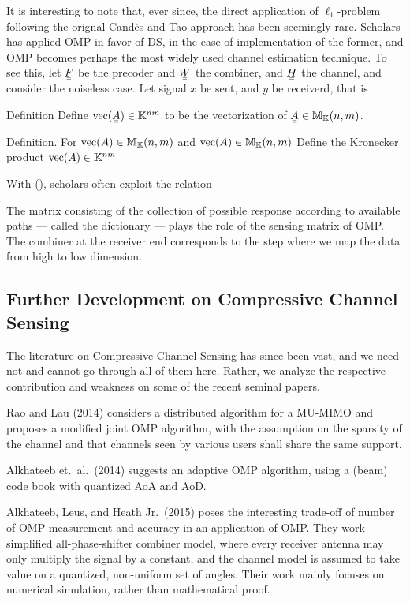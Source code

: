 It is interesting to note that, ever since, the direct application of \(\ell_1\)-problem following the orignal Cand\`es-and-Tao approach has been seemingly rare.
Scholars has applied OMP in favor of DS, in the ease of implementation of the former, and OMP becomes perhaps the most widely used channel estimation technique.
To see this, let \(\M{F}\) be the precoder and \(\M{W}\) the combiner, and \(\M{H}\) the channel, and consider the noiseless case.
Let signal \(x\) be sent, and \(y\) be receiverd, that is
%
%

\Result
{Definition}
{
Define \(\RM{vec}(\M{A}) \in \MB{K}^{nm}\) to be the vectorization of \(\M{A} \in \MB{M}_{\MB{K}}(n,m)\).
}

\Result
{Definition.}
{
For \(\mathrm{vec}(A) \in \mathbb{M}_{\mathbb{K}}(n,m)\) and \(\mathrm{vec}(A) \in \mathbb{M}_{\mathbb{K}}(n,m)\)
Define the Kronecker product \(\mathrm{vec}(A) \in \mathbb{K}^{nm}\) 
}

With (), scholars often exploit the relation
%
%

The matrix consisting of the collection of possible response according to available paths --- called the dictionary --- plays the role of the sensing matrix of OMP.
The combiner at the receiver end corresponds to the step where we map the data from high to low dimension.


\subsection{Further Development on Compressive Channel Sensing}

The literature on Compressive Channel Sensing has since been vast, and we need not and cannot go through all of them here.
Rather, we analyze the respective contribution and weakness on some of the recent seminal papers.

Rao and Lau (2014) considers a distributed algorithm for a MU-MIMO and proposes a modified joint OMP algorithm, with the assumption on the sparsity of the channel and that channels seen by various users shall share the same support.

Alkhateeb et.\ al.\ (2014) suggests an adaptive OMP algorithm, using a (beam) code book with quantized AoA and AoD.

Alkhateeb, Leus, and Heath Jr.\ (2015) poses the interesting trade-off of number of OMP measurement and accuracy in an application of OMP.
They work simplified all-phase-shifter combiner model, where every receiver antenna may only multiply the signal by a constant, and the channel model is assumed to take value on a quantized, non-uniform set of angles.
Their work mainly focuses on numerical simulation, rather than mathematical proof.

